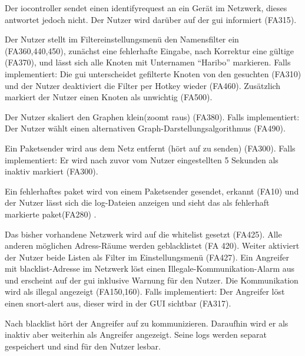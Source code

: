 \begin{description}[style=multiline, leftmargin=4cm, labelwidth=4cm]
  \item[\namedlabel{timeout}{Timeoutbenachrichtigung (optional)}] Der \gls{iocontroller} sendet einen \gls{identifyrequest} an ein Gerät im Netzwerk, dieses antwortet jedoch nicht. Der Nutzer wird darüber auf der \gls{gui} informiert (FA315).
  
  \item[\namedlabel{filter}{Filter anwenden (optional)}] Der Nutzer stellt im Filtereinstellungsmenü den Namensfilter ein (FA360,440,450), zunächst eine fehlerhafte Eingabe, nach Korrektur eine gültige (FA370), und lässt sich alle Knoten mit Unternamen “Haribo” markieren. Falls implementiert: Die \gls{gui} unterscheidet gefilterte Knoten von den gesuchten (FA310) und der Nutzer deaktiviert die Filter per Hotkey wieder (FA460). Zusätzlich markiert der Nutzer einen Knoten als unwichtig (FA500).
  
  \item[\namedlabel{guiChanging}{Graph verändern}] Der Nutzer skaliert den Graphen klein(zoomt raus) (FA380). Falls implementiert: Der Nutzer wählt einen alternativen Graph-Darstellungsalgorithmus (FA490).
  
  \item[\namedlabel{inactive}{Netzteilnehmer wird inaktiv}] Ein Paketsender wird aus dem Netz entfernt (hört auf zu senden) (FA300). Falls implementiert: Er wird nach zuvor vom Nutzer eingestellten 5 Sekunden als inaktiv markiert (FA300).
  
  \item[\namedlabel{errpak}{Fehlerhaftes Paket}] Ein fehlerhaftes \gls{paket} wird von einem Paketsender gesendet, erkannt (FA10) und der Nutzer lässt sich die \gls{log}-Dateien anzeigen und sieht das als fehlerhaft markierte \gls{paket}(FA280) .
  
  \item[\namedlabel{blacklist}{Blacklist}] Das bisher vorhandene Netzwerk wird auf die \gls{whitelist} gesetzt (FA425). Alle anderen möglichen Adress-Räume werden geblacklistet (FA 420). Weiter aktiviert der Nutzer beide Listen als Filter im Einstellungsmenü (FA427). Ein Angreifer mit \gls{blacklist}-Adresse im Netzwerk löst einen Illegale-Kommunikation-Alarm aus und erscheint auf der \gls{gui} inklusive Warnung für den Nutzer. Die Kommunikation wird als illegal angezeigt (FA150,160). Falls implementiert: Der Angreifer löst einen \gls{snort}-\gls{alert} aus, dieser wird in der GUI sichtbar (FA317).
  
  \item[\namedlabel{inactiveBlacklist}{Inaktiver geblacklisteter Teilnehmer}] Nach \gls{blacklist} hört der Angreifer auf zu kommunizieren. Daraufhin wird er als inaktiv aber weiterhin als Angreifer angezeigt. Seine \glspl{log} werden separat gespeichert und sind für den Nutzer lesbar.
  

\end{description}
